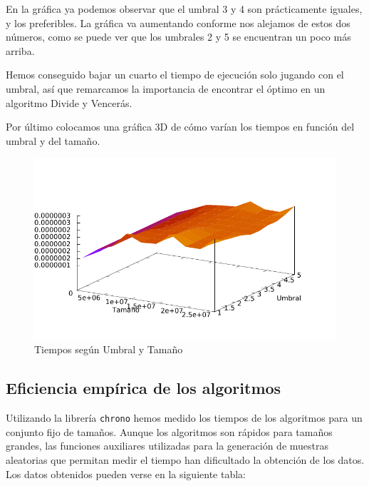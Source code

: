 En la gráfica ya podemos observar que el umbral 3 y 4 son prácticamente iguales, y los preferibles. La gráfica va aumentando conforme nos alejamos de estos dos números, como se puede ver que los umbrales 2 y 5 se encuentran un poco más arriba.

Hemos conseguido bajar un cuarto el tiempo de ejecución solo jugando con el umbral, así que remarcamos la importancia de encontrar el óptimo en un algoritmo Divide y Vencerás.

Por último colocamos una gráfica 3D de cómo varían los tiempos en función del umbral y del tamaño.

\begin{figure}[H]\includegraphics[width=13cm]{img/umbral_posicion.pdf} \centering
	\caption{Tiempos según Umbral y Tamaño}\end{figure}

\subsection{Eficiencia empírica de los algoritmos}

Utilizando la librería \texttt{chrono} hemos medido los tiempos de los algoritmos para un conjunto fijo de tamaños. Aunque los algoritmos son rápidos para tamaños grandes, las funciones auxiliares utilizadas para la generación de muestras aleatorias que permitan medir el tiempo han dificultado la obtención de los datos. Los datos obtenidos pueden verse en la siguiente tabla:



\vspace*{1cm}

\posObvio
{}\posDyV
{}\posDyVTwo
{} {\posObvio}
 {\posObvio}

